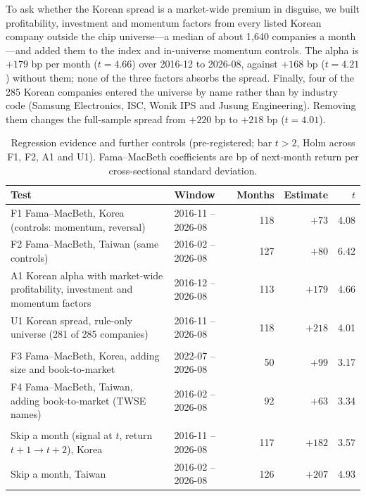 \documentclass[12pt,a4paper]{article}
\begin{document}
To ask whether the Korean spread is a market-wide premium in disguise, we built profitability, investment and
momentum factors from every listed Korean company outside the chip universe---a median of about 1{,}640 companies a
month---and added them to the index and in-universe momentum controls. The alpha is $+179$ bp per month ($t=4.66$)
over 2016-12 to 2026-08, against $+168$ bp ($t=4.21$) without them; none of the three factors absorbs the spread.
Finally, four of the 285 Korean companies entered the universe by name rather than by industry code (Samsung
Electronics, ISC, Wonik IPS and Jusung Engineering). Removing them changes the full-sample spread from $+220$ bp to
$+218$ bp ($t=4.01$).

\begin{table}[!htbp]
\centering
\caption{Regression evidence and further controls (pre-registered; bar $t>2$, Holm across F1, F2, A1 and U1).
Fama--MacBeth coefficients are bp of next-month return per cross-sectional standard deviation.}
\label{tab:fm}
\small
\begin{tabularx}{\textwidth}{@{}>{\raggedright\arraybackslash}X l r r r@{}}
\toprule
Test & Window & Months & Estimate & $t$ \\
\midrule
F1 Fama--MacBeth, Korea (controls: momentum, reversal) & 2016-11 -- 2026-08 & 118 & $+73$ & 4.08 \\
F2 Fama--MacBeth, Taiwan (same controls) & 2016-02 -- 2026-08 & 127 & $+80$ & 6.42 \\
A1 Korean alpha with market-wide profitability, investment and momentum factors & 2016-12 -- 2026-08 & 113 & $+179$ & 4.66 \\
U1 Korean spread, rule-only universe (281 of 285 companies) & 2016-11 -- 2026-08 & 118 & $+218$ & 4.01 \\
\addlinespace
\multicolumn{5}{@{}l}{\textit{Secondary (shorter windows)}} \\
F3 Fama--MacBeth, Korea, adding size and book-to-market & 2022-07 -- 2026-08 & 50 & $+99$ & 3.17 \\
F4 Fama--MacBeth, Taiwan, adding book-to-market (TWSE names) & 2016-02 -- 2026-08 & 92 & $+63$ & 3.34 \\
\addlinespace
\multicolumn{5}{@{}l}{\textit{Descriptive}} \\
Skip a month (signal at $t$, return $t{+}1 \to t{+}2$), Korea & 2016-11 -- 2026-08 & 117 & $+182$ & 3.57 \\
Skip a month, Taiwan & 2016-02 -- 2026-08 & 126 & $+207$ & 4.93 \\
\bottomrule
\end{tabularx}
\end{table}
\end{document}
